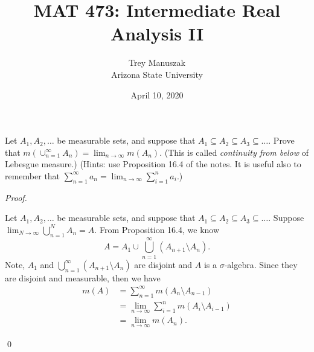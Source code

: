 \documentclass[12pt]{article}
\title{MAT 473: Intermediate Real Analysis II}
\date{April 10, 2020}
\author{Trey Manuszak\\ Arizona State University}
\newenvironment{problem}[2][Problem]{\begin{trivlist}
\item[\hskip \labelsep {\bfseries #1}\hskip \labelsep {\bfseries
#2.}]}{\end{trivlist}}
\newenvironment{sol}
    {\emph{Proof.}
    }
    {
    \qed
    }
\begin{document}


\maketitle
\newpage


\begin{problem}{37}
  Let $A_1,A_2,\dots$ be measurable sets, and suppose that $A_1 \subseteq A_2 \subseteq A_3 \subseteq \dots$. Prove that $m(\cup _{n = 1}^{\infty}A_n) = \lim_{n \to \infty}m(A_n)$. (This is called \textit{continuity from below} of Lebesgue measure.) (Hints: use Proposition 16.4 of the notes. It is useful also to remember that $\sum_{n = 1}^{\infty}a_n = \lim_{n \to \infty}\sum_{i = 1}^{n}a_i$.)
\end{problem}
\begin{sol}
  Let $A_1,A_2,\dots$ be measurable sets, and suppose that $A_1 \subseteq A_2 \subseteq A_3 \subseteq \dots$. Suppose $\lim_{N \to \infty} \bigcup_{n = 1}^NA_n = A$. From Proposition 16.4, we know $$A = A_1 \cup \bigcup_{n = 1}^{\infty}(A_{n+1}  \setminus A_n).$$ Note, $A_1$ and $\bigcup_{n = 1}^{\infty}(A_{n+1}  \setminus A_n)$ are disjoint and $A$ is a $\sigma$-algebra. Since they are disjoint and measurable, then we have 
  \begin{align*}
    m(A) &= \sum_{n = 1}^{\infty}m(A_n \setminus A_{n-1}) \\
    &= \lim_{n \to \infty} \sum_{i = 1}^n m(A_i \setminus A_{i - 1}) \\
    &= \lim_{n \to \infty} m(A_n).
  \end{align*}
\end{sol}
\end{document}

